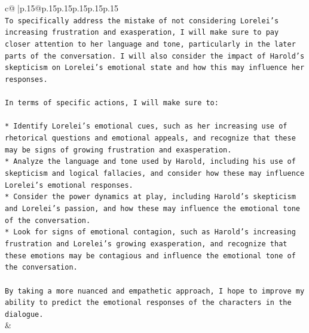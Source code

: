 \documentclass{article}
\begin{document}
{\begin{supertabular}{c@{$\;$}|p{.15\linewidth}@{}p{.15\linewidth}p{.15\linewidth}p{.15\linewidth}p{.15\linewidth}p{.15\linewidth}}
{{{\\ 
\texttt{To specifically address the mistake of not considering Lorelei's increasing frustration and exasperation, I will make sure to pay closer attention to her language and tone, particularly in the later parts of the conversation. I will also consider the impact of Harold's skepticism on Lorelei's emotional state and how this may influence her responses.} \\
\\ 
\texttt{In terms of specific actions, I will make sure to:} \\
\\ 
\texttt{* Identify Lorelei's emotional cues, such as her increasing use of rhetorical questions and emotional appeals, and recognize that these may be signs of growing frustration and exasperation.} \\
\texttt{* Analyze the language and tone used by Harold, including his use of skepticism and logical fallacies, and consider how these may influence Lorelei's emotional responses.} \\
\texttt{* Consider the power dynamics at play, including Harold's skepticism and Lorelei's passion, and how these may influence the emotional tone of the conversation.} \\
\texttt{* Look for signs of emotional contagion, such as Harold's increasing frustration and Lorelei's growing exasperation, and recognize that these emotions may be contagious and influence the emotional tone of the conversation.} \\
\\ 
\texttt{By taking a more nuanced and empathetic approach, I hope to improve my ability to predict the emotional responses of the characters in the dialogue.} \\
            }
        }
    }
    & \\ \\

\end{supertabular}
}
\end{document}
